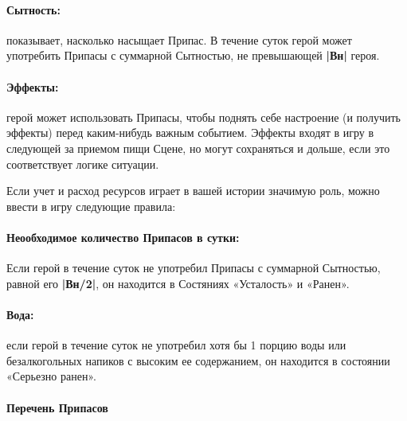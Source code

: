 \paragraph{Сытность:} показывает, насколько насыщает Припас. В течение суток герой может употребить Припасы с суммарной Сытностью, не превышающей \textbf{|Вн|} героя.
\paragraph{Эффекты:} герой может использовать Припасы, чтобы поднять себе настроение (и получить эффекты) перед каким-нибудь важным событием. Эффекты входят в игру в следующей за приемом пищи Сцене, но могут сохраняться и дольше, если это соответствует логике ситуации.
\begin{tcolorbox}
    Если учет и расход ресурсов играет в вашей истории значимую роль, можно ввести в игру следующие правила:
    \paragraph{Неообходимое количество Припасов в сутки:} Если герой в течение суток не употребил Припасы с суммарной Сытностью, равной его \textbf{|Вн/2|}, он находится в Состяниях «Усталость» и «Ранен».
    \paragraph{Вода:} если герой в течение суток не употребил хотя бы 1 порцию воды или безалкогольных напиков с высоким ее содержанием, он находится в состоянии «Серьезно ранен».
\end{tcolorbox}
\paragraph{Перечень Припасов}



